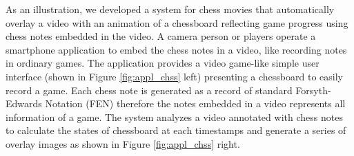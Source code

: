 As an illustration, we developed a system for chess movies that automatically overlay a video with an animation of a chessboard reflecting game progress using chess notes embedded in the video.
A camera person or players operate a smartphone application to embed the chess notes in a video, like recording notes in ordinary games.
The application provides a video game-like simple user interface (shown in Figure \ref{fig:appl_chss} left) presenting a chessboard to easily record a game.
Each chess note is generated as a record of standard Forsyth-Edwards Notation (FEN) therefore the notes embedded in a video represents all information of a game.
The system analyzes a video annotated with chess notes to calculate the states of chessboard at each timestamps and generate a series of overlay images as shown in Figure \ref{fig:appl_chss} right.
